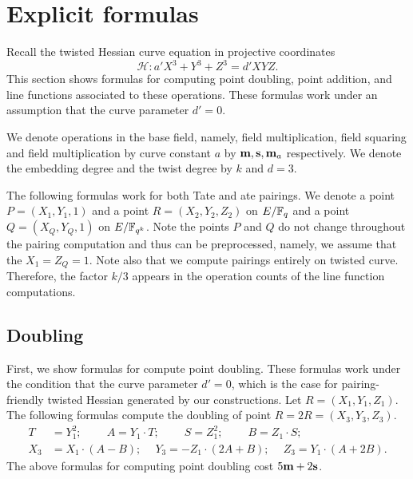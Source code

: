 \section{Explicit formulas}
\label{sec:formulas}

Recall the twisted Hessian curve equation in projective coordinates
$$ \mathcal{H}: a' X^3 + Y^3 + Z^3 = d' X Y Z. $$
This section shows formulas for computing point doubling, point addition,
and line functions associated to these operations.
These formulas work under an assumption that the curve parameter $d' = 0$.

We denote operations in the base field, namely, 
field multiplication, field squaring and field multiplication by curve constant $a$
by $\textbf{m}, \textbf{s}, \textbf{m}_{a}$ respectively.
We denote the embedding degree and the twist degree by $k$ and $d=3$.

The following formulas work for both Tate and ate pairings.
We denote a point $P = (X_1,Y_1,1)$ and a point $R = (X_2,Y_2,Z_2)$ on $E/\mathbb{F}_{q}$
and a point $Q = (X_{Q},Y_{Q},1)$ on $E/\mathbb{F}_{q^{k}}$.
Note the points $P$ and $Q$ do not change throughout the pairing computation and thus can be preprocessed,
namely, we assume that the $X_1 = Z_{Q} = 1$.
Note also that we compute pairings entirely on twisted curve.
Therefore, the factor $k/3$ appears in the operation counts of the line function computations.


\subsection{Doubling}
First, we show formulas for compute point doubling.
These formulas work under the condition that the curve parameter $d'=0$,
which is the case for pairing-friendly twisted Hessian generated by our constructions.
Let $R = (X_1, Y_1, Z_1)$.
The following formulas compute the doubling of point $R = 2R = (X_3,Y_3,Z_3)$.
\begin{align*}
T &= Y_1^2;\	\qquad	A = Y_1 \cdot T;\	\qquad
S = Z_1 ^ 2;\	\qquad	B = Z_1 \cdot S;\\
X_3 &= X_1 \cdot (A - B);\	\quad
Y_3 = -Z_1 \cdot (2A + B);\	\quad
Z_3 = Y_1 \cdot (A + 2B).
\end{align*}
The above formulas for computing point doubling
cost $5\textbf{m} + 2\textbf{s}$. %


